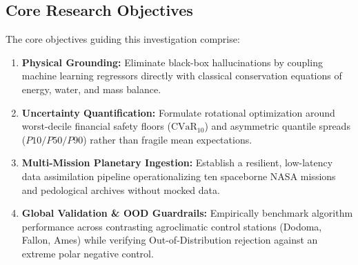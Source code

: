 \documentclass[10pt,twocolumn]{article}
\begin{document}
\subsection{Core Research Objectives}
The core objectives guiding this investigation comprise:
\begin{enumerate}[leftmargin=*]
  \item \textbf{Physical Grounding:} Eliminate black-box hallucinations by coupling machine learning regressors directly with classical conservation equations of energy, water, and mass balance.
  \item \textbf{Uncertainty Quantification:} Formulate rotational optimization around worst-decile financial safety floors ($\text{CVaR}_{10}$) and asymmetric quantile spreads ($P10/P50/P90$) rather than fragile mean expectations.
  \item \textbf{Multi-Mission Planetary Ingestion:} Establish a resilient, low-latency data assimilation pipeline operationalizing ten spaceborne NASA missions and pedological archives without mocked data.
  \item \textbf{Global Validation \& OOD Guardrails:} Empirically benchmark algorithm performance across contrasting agroclimatic control stations (Dodoma, Fallon, Ames) while verifying Out-of-Distribution rejection against an extreme polar negative control.
\end{enumerate}
\end{document}
